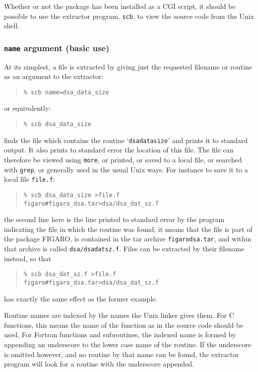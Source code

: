 \documentclass[twoside,11pt]{article}
\newcommand{\xlabel}[1]{}
\renewcommand{\_}{\texttt{\symbol{95}}}
\begin{document}
Whether or not the package has been installed as a CGI script,
it should be 
possible to use the extractor program, {\tt scb},
to view the source code from the Unix shell.

\subsubsection{\xlabel{sec:extract-name}\label{sec:extract-name}{\tt name} argument (basic use)}

At its simplest, a file is extracted by giving just the 
requested filename or routine as an argument to the extractor:
\begin{quote}
\begin{verbatim}
% scb name=dsa_data_size
\end{verbatim}
\end{quote}
or equivalently:
\begin{quote}
\begin{verbatim}
% scb dsa_data_size
\end{verbatim}
\end{quote}
finds the file which contains the routine `{\tt dsa\_data\_size}'
and prints it to standard output.  It also
prints to standard error the location of this file.
The file can therefore be viewed using {\tt more}, or printed,
or saved to a local file, or searched with {\tt grep}, or
generally used in the usual Unix ways.
For instance to save it to a local file {\tt file.f}:
\begin{quote}
\begin{verbatim}
% scb dsa_data_size >file.f
figaro#figaro_dsa.tar>dsa/dsa_dat_sz.f
\end{verbatim}
\end{quote}
the second line here is the line printed to standard error 
by the program indicating the file in which the routine was found;
it means that the file is part of the package FIGARO,
is contained in the tar archive {\tt figaro\_dsa.tar}, and
within that archive is called {\tt dsa/dsa\_dat\_sz.f}.
Files can be extracted by their filename instead,
so that
\begin{quote}
\begin{verbatim}
% scb dsa_dat_sz.f >file.f
figaro#figaro_dsa.tar>dsa/dsa_dat_sz.f
\end{verbatim}
\end{quote}
has exactly the same effect as the former example.

Routine names are indexed by the names the Unix linker gives them.
For C functions, this means the name of the function as in the 
source code should be used.
For Fortran functions and subroutines, the indexed name is 
formed by appending an underscore to the lower case name of the 
routine.  
If the underscore is omitted however, and no routine by that name
can be found, the extractor program will look for a routine with
the underscore appended.
\end{document}
